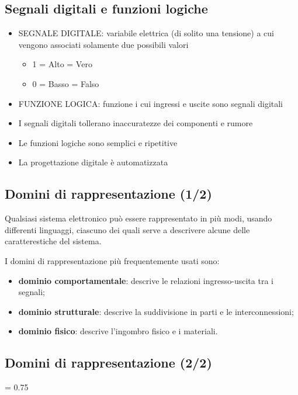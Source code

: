 \documentclass[10pt,a4paper,twoside,twocolumn]{article}
\begin{document}
\subsection{Segnali digitali e funzioni logiche}
\begin{itemize}
\item
SEGNALE DIGITALE: variabile elettrica (di solito una tensione) 
a cui vengono associati solamente due possibili valori
\begin{itemize}
\item
1 = Alto = Vero
\item
0 = Basso = Falso
\end{itemize}
\item
FUNZIONE LOGICA: funzione i cui ingressi e uscite sono segnali digitali
\bigskip

\item 
I segnali digitali tollerano inaccuratezze dei componenti e rumore
\item
Le funzioni logiche sono semplici e ripetitive
\item
La progettazione digitale \`e automatizzata
\end{itemize}



\subsection{Domini di rappresentazione (1/2)}
Qualsiasi sistema elettronico pu\`o essere rappresentato in pi\`u modi, 
usando differenti linguaggi, ciascuno dei quali serve a descrivere alcune 
delle caratterestiche del sistema.

I domini di rappresentazione pi\`u frequentemente usati sono:
\begin{itemize}
\item \textbf{\color{darkgreen}dominio comportamentale}: descrive le relazioni ingresso-uscita tra i segnali;
\item \textbf{\color{blue}dominio strutturale}: descrive la suddivisione in parti e le interconnessioni;
\item \textbf{\color{red}dominio fisico}: descrive l'ingombro fisico e i materiali.
\end{itemize}



\subsection{Domini di rappresentazione (2/2)}
\vspace{-5mm}
\begin{center}
\epsfxsize = 0.75 \columnwidth
{}
\end{center}
\end{document}
